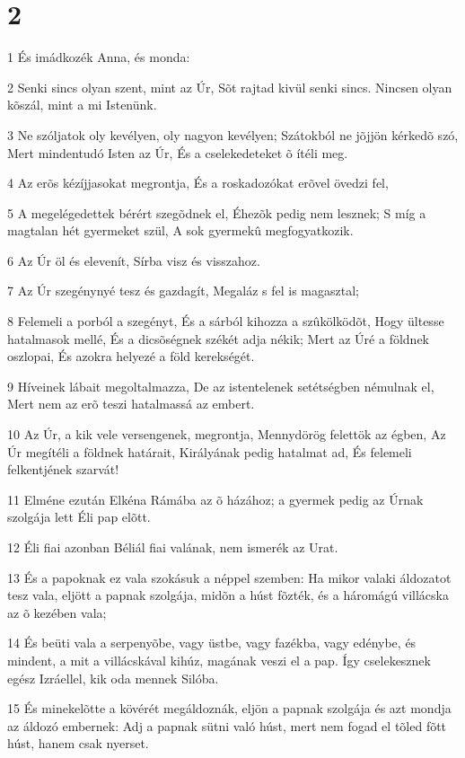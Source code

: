 \chapter{2}

\par 1 És imádkozék Anna, és monda:
\par 2 Senki sincs olyan szent, mint az Úr, Sõt rajtad kivül senki sincs. Nincsen olyan kõszál, mint a mi Istenünk.
\par 3 Ne szóljatok oly kevélyen, oly nagyon kevélyen; Szátokból ne jõjjön kérkedõ szó, Mert mindentudó Isten az Úr, És a cselekedeteket õ ítéli meg.
\par 4 Az erõs kézíjjasokat megrontja, És a roskadozókat erõvel övedzi fel,
\par 5 A megelégedettek bérért szegõdnek el, Éhezõk pedig nem lesznek; S míg a magtalan hét gyermeket szül, A sok gyermekû megfogyatkozik.
\par 6 Az Úr öl és elevenít, Sírba visz és visszahoz.
\par 7 Az Úr szegénynyé tesz és gazdagít, Megaláz s fel is magasztal;
\par 8 Felemeli a porból a szegényt, És a sárból kihozza a szûkölködõt, Hogy ültesse hatalmasok mellé, És a dicsõségnek székét adja nékik; Mert az Úré a földnek oszlopai, És azokra helyezé a föld kerekségét.
\par 9 Híveinek lábait megoltalmazza, De az istentelenek setétségben némulnak el, Mert nem az erõ teszi hatalmassá az embert.
\par 10 Az Úr, a kik vele versengenek, megrontja, Mennydörög felettök az égben, Az Úr megítéli a földnek határait, Királyának pedig hatalmat ad, És felemeli felkentjének szarvát!
\par 11 Elméne ezután Elkéna Rámába az õ házához; a gyermek pedig az Úrnak szolgája lett Éli pap elõtt.
\par 12 Éli fiai azonban Béliál fiai valának, nem ismerék az Urat.
\par 13 És a papoknak ez vala szokásuk a néppel szemben: Ha mikor valaki áldozatot tesz vala, eljött a papnak szolgája, midõn a húst fõzték, és a háromágú villácska az õ kezében vala;
\par 14 És beüti vala a serpenyõbe, vagy üstbe, vagy fazékba, vagy edénybe, és mindent, a mit a villácskával kihúz, magának veszi el a pap. Így cselekesznek egész Izráellel, kik oda mennek Silóba.
\par 15 És minekelõtte a kövérét megáldoznák, eljön a papnak szolgája és azt mondja az áldozó embernek: Adj a papnak sütni való húst, mert nem fogad el tõled fõtt húst, hanem csak nyerset.
